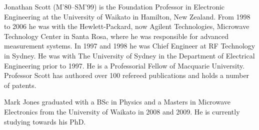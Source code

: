 \documentclass[10pt,final,journal]{IEEEtran}
\begin{document}
\begin{IEEEbiography}{Jonathan Scott}
(M'80--SM'99) is the Foundation Professor in
Electronic Engineering at the University of Waikato in Hamilton, New
Zealand.  From 1998 to 2006 he was with the Hewlett-Packard,
now Agilent Technologies, Microwave Technology Center in Santa Rosa,
where he was responsible for advanced measurement systems.  In 1997 and
1998 he was Chief Engineer at RF Technology in Sydney.  He was with The
University of Sydney in the Department of Electrical Engineering prior
to 1997.  He is a Professorial Fellow of Macquarie
University.  Professor Scott has authored over 100 refereed
publications and holds a number of patents.
\end{IEEEbiography}


\begin{IEEEbiography}{Mark Jones}
graduated with a BSc in Physics and a Masters in Microwave Electronics from the University of Waikato in 2008 and 2009.
He is currently studying towards his PhD.
\end{IEEEbiography}
\end{document}
